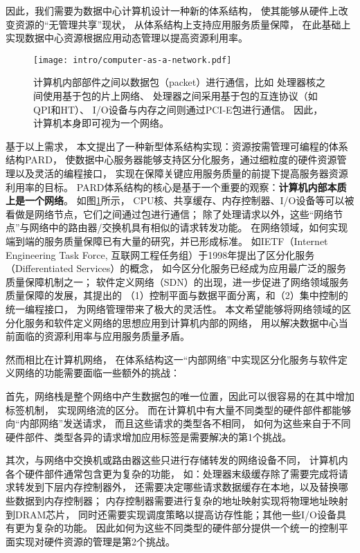 因此，我们需要为数据中心计算机设计一种新的体系结构，
使其能够从硬件上改变资源的``无管理共享''现状，
从体系结构上支持应用服务质量保障，
在此基础上实现数据中心资源根据应用动态管理以提高资源利用率。

\begin{figure}[H]
  \centering
  \texttt{[image: intro/computer-as-a-network.pdf]}
  \caption[计算机内部本质是一个网络]{
    计算机内部部件之间以数据包（packet）进行通信，比如
    处理器核之间使用基于包的片上网络、
    处理器之间采用基于包的互连协议（如QPI和HT）、
    I/O设备与内存之间则通过PCI-E包进行通信。
    因此，计算机本身即可视为一个网络。}
  \label{fig:computer-as-a-network}
\end{figure}

基于以上需求，
本文提出了一种新型体系结构实现：资源按需管理可编程的体系结构PARD\cite{pard:2015}，
使数据中心服务器能够支持区分化服务，通过细粒度的硬件资源管理以及灵活的编程接口，
实现在保障关键应用服务质量的前提下提高服务器资源利用率的目标。
PARD体系结构的核心是基于一个重要的观察：\textbf{计算机内部本质上是一个网络}。
如图\ref{fig:computer-as-a-network}所示，
CPU核、共享缓存、内存控制器、I/O设备等可以被看做是网络节点，它们之间通过包进行通信；
除了处理请求以外，这些``网络节点''与网络中的路由器/交换机具有相似的请求转发功能。
在网络领域，如何实现端到端的服务质量保障已有大量的研究，并已形成标准。
如IETF（Internet Engineering Task Force, 互联网工程任务组）于1998年提出了区分化服务
（Differentiated Services）\cite{DiffServ}的概念，
如今区分化服务已经成为应用最广泛的服务质量保障机制之一；
软件定义网络（SDN）\cite{SDN}的出现，进一步促进了网络领域服务质量保障的发展，其提出的
（1）控制平面与数据平面分离，和（2）集中控制的统一编程接口，
为网络管理带来了极大的灵活性。
本文希望能够将网络领域的区分化服务和软件定义网络的思想应用到计算机内部的网络，
用以解决数据中心当前面临的资源利用率与应用服务质量矛盾。

然而相比在计算机网络，
在体系结构这一``内部网络''中实现区分化服务与软件定义网络的功能需要面临一些额外的挑战：

首先，网络栈是整个网络中产生数据包的唯一位置，因此可以很容易的在其中增加标签机制，
实现网络流的区分。
而在计算机中有大量不同类型的硬件部件都能够向``内部网络''发送请求，
而且这些请求的类型各不相同，
如何为这些来自于不同硬件部件、类型各异的请求增加应用标签是需要解决的第1个挑战。

其次，与网络中交换机或路由器这些只进行存储转发的网络设备不同，
计算机内各个硬件部件通常包含更为复杂的功能，
如：处理器末级缓存除了需要完成将请求转发到下层内存控制器外，
还需要决定哪些请求数据缓存在本地，以及替换哪些数据到内存控制器；
内存控制器需要进行复杂的地址映射实现将物理地址映射到DRAM芯片，
同时还需要实现调度策略以提高访存性能；其他一些I/O设备具有更为复杂的功能。
因此如何为这些不同类型的硬件部分提供一个统一的控制平面实现对硬件资源的管理是第2个挑战。

